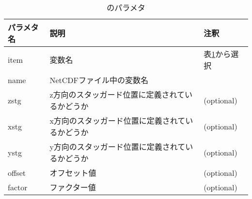 {\small
\begin{table}[tbh]
\begin{center}
\caption{のパラメタ}
\label{tab:netcdf_item}
\begin{tabularx}{150mm}{llX} \hline
\rowcolor[gray]{0.9}
パラメタ名 & 説明    & 注釈 \\ \hline
item     & 変数名 & 表\ref{tab:netcdf_item}から選択   \\ \hline
name     & NetCDFファイル中の変数名 & \\ \hline
zstg     & z方向のスタッガード位置に定義されているかどうか & (optional) \\ \hline
xstg     & x方向のスタッガード位置に定義されているかどうか & (optional) \\ \hline
ystg     & y方向のスタッガード位置に定義されているかどうか & (optional) \\ \hline
offset   & オフセット値 & (optional) \\ \hline
factor   & ファクター値 & (optional) \\ \hline
\end{tabularx}
\end{center}
\end{table}
}

